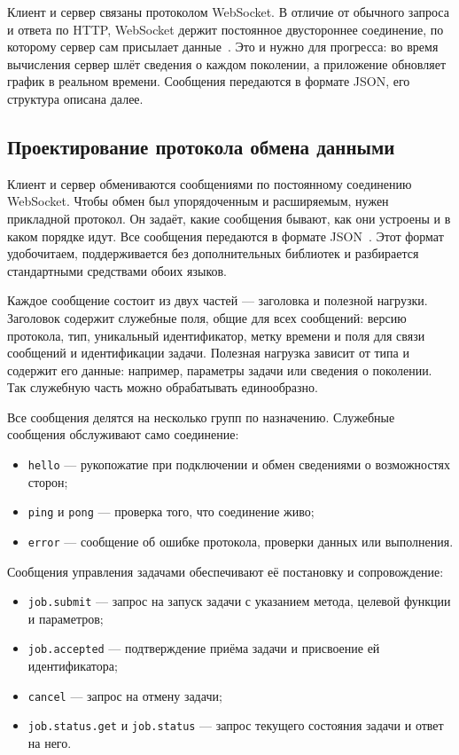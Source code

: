 \documentclass[14pt, a4paper]{extarticle}
\begin{document}
Клиент и сервер связаны протоколом WebSocket. В отличие от обычного запроса и
ответа по HTTP, WebSocket держит постоянное двустороннее соединение, по которому
сервер сам присылает данные~\cite{rfc6455}. Это и нужно для прогресса: во время
вычисления сервер шлёт сведения о каждом поколении, а приложение обновляет график
в реальном времени. Сообщения передаются в формате JSON, его структура описана
далее.

\subsection{Проектирование протокола обмена данными}
\label{subsec:protocol-design}

Клиент и сервер обмениваются сообщениями по постоянному соединению WebSocket.
Чтобы обмен был упорядоченным и расширяемым, нужен прикладной протокол. Он задаёт,
какие сообщения бывают, как они устроены и в каком порядке идут. Все сообщения
передаются в формате JSON~\cite{rfc8259}. Этот формат удобочитаем, поддерживается
без дополнительных библиотек и разбирается стандартными средствами обоих языков.

Каждое сообщение состоит из двух частей --- заголовка и полезной нагрузки.
Заголовок содержит служебные поля, общие для всех сообщений: версию протокола, тип,
уникальный идентификатор, метку времени и поля для связи сообщений и идентификации
задачи. Полезная нагрузка зависит от типа и содержит его данные: например,
параметры задачи или сведения о поколении. Так служебную часть можно обрабатывать
единообразно.

Все сообщения делятся на несколько групп по назначению. Служебные сообщения
обслуживают само соединение:
\begin{itemize}
  \item \texttt{hello} --- рукопожатие при подключении и обмен сведениями о
  возможностях сторон;
  \item \texttt{ping} и \texttt{pong} --- проверка того, что соединение живо;
  \item \texttt{error} --- сообщение об ошибке протокола, проверки данных или
  выполнения.
\end{itemize}

Сообщения управления задачами обеспечивают её постановку и сопровождение:
\begin{itemize}
  \item \texttt{job.submit} --- запрос на запуск задачи с указанием метода,
  целевой функции и параметров;
  \item \texttt{job.accepted} --- подтверждение приёма задачи и присвоение ей
  идентификатора;
  \item \texttt{cancel} --- запрос на отмену задачи;
  \item \texttt{job.status.get} и \texttt{job.status} --- запрос текущего
  состояния задачи и ответ на него.
\end{itemize}
\end{document}
